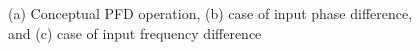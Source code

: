 \begin{figure}[h]
    \centering
    \caption{(a) Conceptual PFD operation, (b) case of input phase difference, and (c) case of input frequency difference}
    \label{fig:pfd_block}
\end{figure}